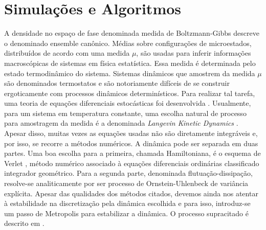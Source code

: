 \chapter{Simulações e Algoritmos}
\label{Capitulo: Simulações}

A densidade no espaço de fase denominada medida de Boltzmann-Gibbs descreve o denominado ensemble canônico. Médias sobre configurações de microestados, distribuídos de acordo com uma medida $\mu$, são usadas para inferir informações macroscópicas de sistemas em física estatística. Essa medida é determinada pelo estado termodinâmico do sistema. Sistemas dinâmicos que amostrem da medida $\mu$ são denominados termostatos e são notoriamente difíceis de se construir ergoticamente com processos dinâmicos determinísticos. Para realizar tal tarefa, uma teoria de equações diferenciais estocásticas foi desenvolvida \cite{leimmolecular}. Usualmente, para um sistema em temperatura constante, uma escolha natural de processo para amostragem da medida é a denominada \textit{Langevin Kinetic Dynamics} \cite{Stoltz2018}. Apesar disso, muitas vezes as equações usadas não são diretamente integráveis e, por isso, se recorre a métodos numéricos. A dinâmica pode ser separada em duas partes. Uma boa escolha para a primeira, chamada Hamiltoniana, é o esquema de Verlet \cite{Verlet}, método numérico associado à equações diferenciais ordinárias classificado integrador geométrico. Para a segunda parte, denominada flutuação-dissipação, resolve-se analiticamente por ser processo de Ornstein-Uhlenbeck de variância explícita. Apesar das qualidades dos métodos citados, devemos ainda nos atentar à estabilidade na discretização pela dinâmica escolhida e para isso, introduz-se um passo de Metropolis para estabilizar a dinâmica. O processo supracitado é descrito em \cite{Chafa2018}.



